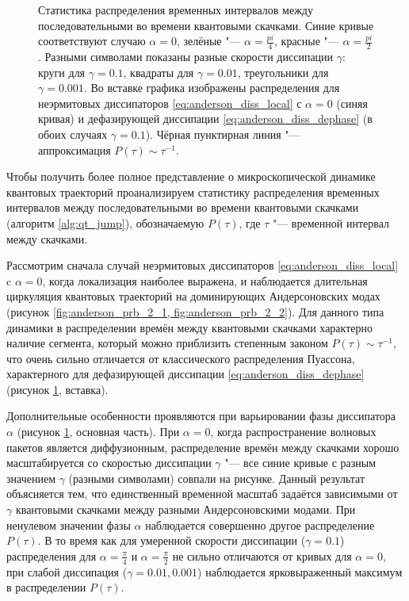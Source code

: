 \begin{figure}[h]
	\caption[Статистика распределения временных интервалов между последовательными во времени квантовыми скачками для разных режимов распространения волновых пакетов]{
		Статистика распределения временных интервалов между последовательными во времени квантовыми скачками. Синие кривые соответствуют случаю \(\alpha=0\), зелёные "--- \(\alpha = \frac{pi}{4}\), красные "--- \(\alpha = \frac{pi}{2}\). Разными символами показаны разные скорости диссипации \(\gamma\):  круги для \(\gamma=0.1\), квадраты для \(\gamma=0.01\), треугольники для \(\gamma=0.001\). Во вставке графика изображены распределения для неэрмитовых диссипаторов \cref{eq:anderson_diss_local} с \(\alpha=0\) (синяя кривая) и дефазирующей диссипации \cref{eq:anderson_diss_dephase} (в обоих случаях \(\gamma=0.1\)). Чёрная пунктирная линия "--- аппроксимация \(P(\tau) \sim \tau^{-1}\).
	}
	\label{fig:anderson_prb_5}
\end{figure}

Чтобы получить более полное представление о микроскопической динамике квантовых траекторий проанализируем статистику распределения временных интервалов между последовательными во времени квантовыми скачками (алгоритм \ref{alg:qt_jump}), обозначаемую \(P(\tau)\), где \(\tau\) "--- временной интервал между скачками.

Рассмотрим сначала случай неэрмитовых диссипаторов \cref{eq:anderson_diss_local} c \(\alpha=0\), когда локализация наиболее выражена, и наблюдается длительная циркуляция квантовых  траекторий на доминирующих Андерсоновских модах (рисунок \cref{fig:anderson_prb_2_1, fig:anderson_prb_2_2}). 
Для данного типа динамики в распределении времён между квантовыми скачками  характерно наличие сегмента, который можно приблизить степенным законом \(P(\tau) \sim \tau^{-1}\), что очень сильно отличается от классического распределения Пуассона, характерного для дефазирующей диссипации \cref{eq:anderson_diss_dephase} (рисунок \cref{fig:anderson_prb_5}, вставка).

Дополнительные особенности проявляются при варьировании фазы диссипатора \(\alpha\) (рисунок \cref{fig:anderson_prb_5}, основная часть).
При \(\alpha=0\), когда распространение волновых пакетов является диффузионным, распределение времён между скачками хорошо масштабируется со скоростью диссипации \(\gamma\) "--- все синие кривые с разным значением \(\gamma\) (разными символами) совпали на рисунке.
Данный результат объясняется тем, что единственный временной масштаб задаётся зависимыми от \(\gamma\) квантовыми скачками между разными Андерсоновскими модами.
При ненулевом значении фазы \(\alpha\) наблюдается совершенно другое распределение \(P(\tau)\). 
В то время как для умеренной скорости диссипации (\(\gamma = 0.1\)) распределения для \(\alpha = \frac{\pi}{4}\) и \(\alpha = \frac{\pi}{2}\) не сильно отличаются от кривых для \(\alpha=0\), при слабой диссипация (\(\gamma = 0.01, 0.001\)) наблюдается ярковыраженный максимум в распределении \(P(\tau)\).

